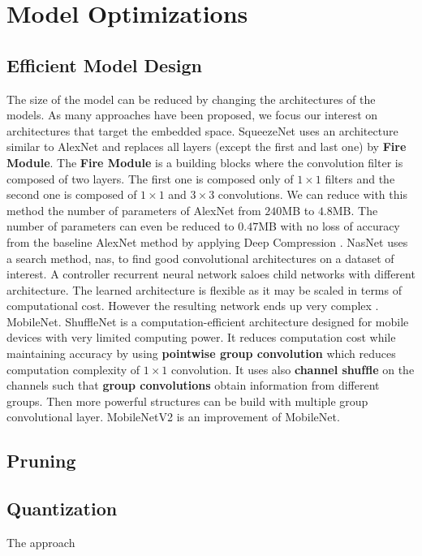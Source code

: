 \section{Model Optimizations} \label{sec:mdopti}
\subsection{Efficient Model Design}
The size of the model can be reduced by changing the architectures of the models. As many approaches have been proposed, we focus our interest on architectures that target the embedded space. \newline \newline
%
SqueezeNet \cite{iandola_squeezenet_2016} uses an architecture similar to AlexNet and replaces all layers (except the first and last one) by \textbf{Fire Module}. The \textbf{Fire Module} is a building blocks where the convolution filter is composed of two layers. The first one is composed only of $1 \times 1$ filters and the second one is composed of $1 \times 1$ and $3 \times 3$ convolutions. We can reduce with this method the number of parameters of AlexNet from $240$MB to $4.8$MB. The number of parameters can even be reduced to $0.47$MB with no loss of accuracy from the baseline AlexNet method by applying Deep Compression \cite{han_deep_2016}. \newline \newline
%
NasNet \cite{zoph_learning_2018} uses a search method, \acrfull{nas}, to find good convolutional architectures on a dataset of interest. A controller recurrent neural network saloes child networks with different architecture. The learned architecture is flexible as it may be scaled in terms of computational cost. However the resulting network ends up very complex \cite{sandler_mobilenetv2_2019}.\newline \newline
%
MobileNet.\newline \newline
%
ShuffleNet \cite{zhang_shufflenet_2018} is a computation-efficient architecture designed for mobile devices with very limited computing power. It reduces computation cost while maintaining accuracy by using \textbf{pointwise group convolution} which reduces computation complexity of $1 \times 1$ convolution. It uses also \textbf{channel shufﬂe} on the channels such that \textbf{group convolutions} obtain information from different groups. Then more powerful structures can be build  with multiple group convolutional layer. \newline \newline
%
MobileNetV2 \cite{sandler_mobilenetv2_2019} is an improvement of MobileNet.\newline \newline
%
\subsection{Pruning}
\subsection{Quantization}
The approach
